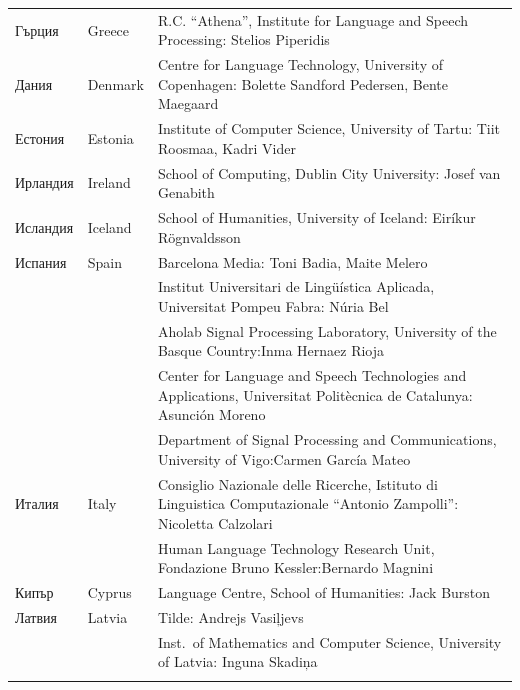 \documentclass[]{../../metanetpaper}
\begin{document}
\begin{longtable}{@{}llp{110mm}@{}}
  Гърция & \textcolor{grey1}{Greece} & R.C. “Athena”, Institute for Language and Speech Processing: Stelios Piperidis\\ \addlinespace
Дания &  \textcolor{grey1}{Denmark} & Centre for Language Technology,
University of Copenhagen: \newline Bolette Sandford Pedersen, Bente
Maegaard\\ \addlinespace
  Естония & \textcolor{grey1}{Estonia} & Institute of Computer
  Science, University of Tartu: Tiit Roosmaa, Kadri Vider\\
  \addlinespace
  Ирландия & \textcolor{grey1}{Ireland} & School of Computing, Dublin City University: Josef van Genabith\\ \addlinespace
  Исландия & \textcolor{grey1}{Iceland} & School of Humanities, University of Iceland: Eiríkur Rögnvaldsson\\ \addlinespace
  Испания & \textcolor{grey1}{Spain} & Barcelona Media: Toni Badia, Maite Melero \\ \addlinespace 
  & & Institut Universitari de Lingüística Aplicada, Universitat Pompeu Fabra: Núria Bel \\ \addlinespace 
  & & Aholab Signal Processing Laboratory, University of the Basque Country:\newline Inma Hernaez Rioja \\ \addlinespace 
  & & Center for Language and Speech Technologies and Applications, Universitat Politècnica de Catalunya:  Asunción Moreno \\ \addlinespace 
  & & Department of Signal Processing and Communications, University of Vigo:\newline Carmen García Mateo \\ \addlinespace 
  Италия & \textcolor{grey1}{Italy} & Consiglio Nazionale delle Ricerche, Istituto di Linguistica Computazionale “Antonio Zampolli”: Nicoletta Calzolari\\ \addlinespace
  & & Human Language Technology Research Unit, Fondazione Bruno Kessler:\newline Bernardo Magnini\\ \addlinespace 
  Кипър & \textcolor{grey1}{Cyprus} & Language Centre, School of
  Humanities: Jack Burston\\ \addlinespace
  Латвия & \textcolor{grey1}{Latvia} & Tilde: Andrejs Vasiļjevs\\ \addlinespace 
  & & Inst.~of Mathematics and Computer Science, University of
  Latvia: Inguna Skadiņa\\ \addlinespace

\end{longtable}
\end{document}
